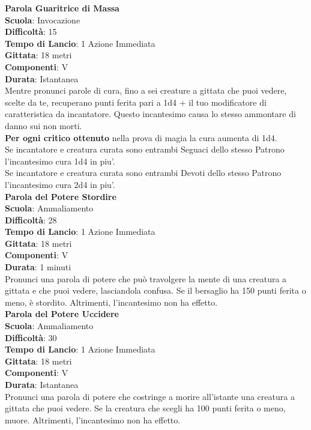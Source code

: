 \begin{multicols}{2}
\medskip\textbf{Parola Guaritrice di Massa}\\
\textbf{Scuola}: Invocazione\\
\textbf{Difficoltà}: 15\\
\textbf{Tempo di Lancio}: 1 Azione Immediata\\
\textbf{Gittata}: 18 metri\\
\textbf{Componenti}: V\\
\textbf{Durata}: Istantanea\\
Mentre pronunci parole di cura, fino a sei creature a gittata che puoi vedere, scelte da te, recuperano punti ferita pari a 1d4 + il tuo modificatore di caratteristica da incantatore. Questo incantesimo causa lo stesso ammontare di danno sui non morti.\\
\textbf{Per ogni critico ottenuto} nella prova di magia la cura aumenta di 1d4.\\
Se incantatore e creatura curata sono entrambi Seguaci dello stesso Patrono l'incantesimo cura 1d4 in piu'.\\
Se incantatore e creatura curata sono entrambi Devoti dello stesso Patrono l'incantesimo cura 2d4 in piu'.\\
 
\medskip\textbf{Parola del Potere Stordire}\\
\textbf{Scuola}: Ammaliamento\\
\textbf{Difficoltà}: 28\\
\textbf{Tempo di Lancio}: 1 Azione Immediata\\
\textbf{Gittata}: 18 metri\\
\textbf{Componenti}: V\\
\textbf{Durata}: 1 minuti\\
Pronunci una parola di potere che può travolgere la mente di una creatura a gittata e che puoi vedere, lasciandola confusa. Se il bersaglio ha 150 punti ferita o meno, è stordito. Altrimenti, l'incantesimo non ha effetto.\\

\medskip\textbf{Parola del Potere Uccidere}\\
\textbf{Scuola}: Ammaliamento\\
\textbf{Difficoltà}: 30\\
\textbf{Tempo di Lancio}: 1 Azione Immediata\\
\textbf{Gittata}: 18 metri\\
\textbf{Componenti}: V\\
\textbf{Durata}: Istantanea\\
Pronunci una parola di potere che costringe a morire all'istante una creatura a gittata che puoi vedere. Se la creatura che scegli ha 100 punti ferita o meno, muore. Altrimenti, l'incantesimo non ha effetto. 


\end{multicols}

